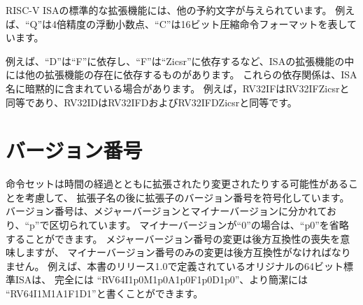 \begin{comment}
Standard extensions to the RISC-V ISA are given other reserved
letters, e.g., ``Q'' for quad-precision floating-point, or
``C'' for the 16-bit compressed instruction format.
\end{comment}
RISC-V ISAの標準的な拡張機能には、他の予約文字が与えられています。
例えば、``Q''は4倍精度の浮動小数点、``C''は16ビット圧縮命令フォーマットを表しています。

\begin{comment}
Some ISA extensions depend on the presence of other extensions, e.g., ``D''
depends on ``F'' and ``F'' depends on ``Zicsr''.  These dependences may be
implicit in the ISA name: for example, RV32IF is equivalent to RV32IFZicsr,
and RV32ID is equivalent to RV32IFD and RV32IFDZicsr.
\end{comment}
例えば、``D''は``F''に依存し、``F''は``Zicsr''に依存するなど、ISAの拡張機能の中には他の拡張機能の存在に依存するものがあります。
これらの依存関係は、ISA名に暗黙的に含まれている場合があります。
例えば，RV32IFはRV32IFZicsrと同等であり、RV32IDはRV32IFDおよびRV32IFDZicsrと同等です。

\begin{comment}
\section{Version Numbers}
\end{comment}
\section{バージョン番号}

\begin{comment}
Recognizing that instruction sets may expand or alter over time, we
encode extension version numbers following the extension name.  Version
numbers are divided into major and minor version numbers, separated by
a ``p''.  If the minor version is ``0'', then ``p0'' can be omitted
from the version string.  Changes in major version numbers imply a
loss of backwards compatibility, whereas changes in only the minor
version number must be backwards-compatible.  For example, the
original 64-bit standard ISA defined in release 1.0 of this manual can
be written in full as ``RV64I1p0M1p0A1p0F1p0D1p0'', more concisely as
``RV64I1M1A1F1D1''.
\end{comment}
命令セットは時間の経過とともに拡張されたり変更されたりする可能性があることを考慮して、
拡張子名の後に拡張子のバージョン番号を符号化しています。
バージョン番号は、メジャーバージョンとマイナーバージョンに分かれており、``p''で区切られています。
マイナーバージョンが``0''の場合は、``p0''を省略することができます。
メジャーバージョン番号の変更は後方互換性の喪失を意味しますが、
マイナーバージョン番号のみの変更は後方互換性がなければなりません。
例えば、本書のリリース1.0で定義されているオリジナルの64ビット標準ISAは、
完全には ``RV64I1p0M1p0A1p0F1p0D1p0''、より簡潔には ``RV64I1M1A1F1D1''と書くことができます。

